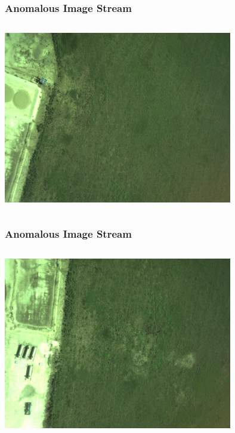 \documentclass{beamer}
\begin{document}
\begin{frame} [noframenumbering]
\frametitle{Anomalous Image Stream}
\begin{columns}
\begin{centering}
\includegraphics[width = 10cm]{Figures/bad4}
\end{centering}
\end{columns}
\end{frame}


\begin{frame} [noframenumbering]
\frametitle{Anomalous Image Stream}
\begin{columns}
\begin{centering}
\includegraphics[width = 10cm]{Figures/bad5}
\end{centering}
\end{columns}
\end{frame}
\end{document}
